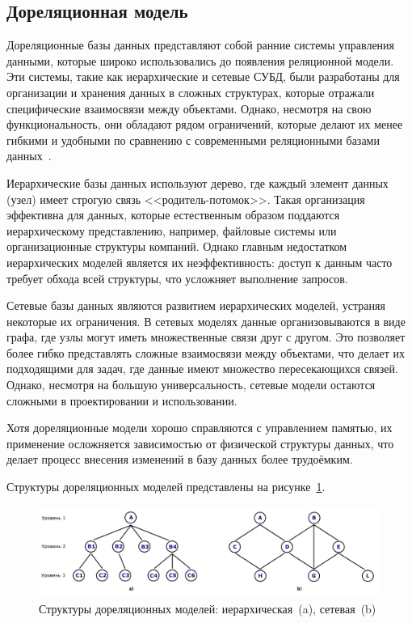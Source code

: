\subsection{Дореляционная модель}

Дореляционные базы данных представляют собой ранние системы управления данными, которые широко использовались до появления реляционной модели. Эти системы, такие как иерархические и сетевые СУБД, были разработаны для организации и хранения данных в сложных структурах, которые отражали специфические взаимосвязи между объектами. Однако, несмотря на свою функциональность, они обладают рядом ограничений, которые делают их менее гибкими и удобными по сравнению с современными реляционными базами данных~\cite{lit7}.

Иерархические базы данных используют дерево, где каждый элемент данных (узел) имеет строгую связь <<родитель-потомок>>. Такая организация эффективна для данных, которые естественным образом поддаются иерархическому представлению, например, файловые системы или организационные структуры компаний. Однако главным недостатком иерархических моделей является их неэффективность: доступ к данным часто требует обхода всей структуры, что усложняет выполнение запросов.

Сетевые базы данных являются развитием иерархических моделей, устраняя некоторые их ограничения. В сетевых моделях данные организовываются в виде графа, где узлы могут иметь множественные связи друг с другом. Это позволяет более гибко представлять сложные взаимосвязи между объектами, что делает их подходящими для задач, где данные имеют множество пересекающихся связей. Однако, несмотря на большую универсальность, сетевые модели остаются сложными в проектировании и использовании.

Хотя дореляционные модели хорошо справляются с управлением памятью, их применение осложняется зависимостью от физической структуры данных, что делает процесс внесения изменений в базу данных более трудоёмким.

\newpage

Структуры дореляционных моделей представлены на рисунке~\ref{fig:hierarchy-model}.

\begin{figure}[h]
	\centering
	\includegraphics[width=1\textwidth]{images/prerelational-model.png}
	\caption{Структуры дореляционных моделей: иерархическая~(a), сетевая~(b)} 
	\label{fig:hierarchy-model} 
\end{figure}

